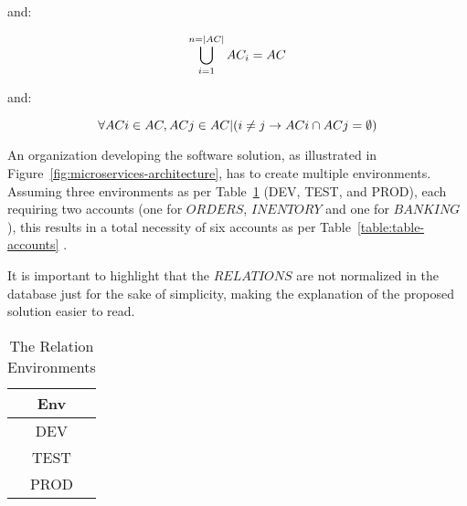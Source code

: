 and:

\begin{equation*}
    \begin{centering}
        \bigcup_{i=1}^{n = |AC|} AC_i = AC 
    \end{centering}
\end{equation*}

and:

\begin{equation*}
    \begin{centering}
        \forall ACi \in AC, ACj \in AC | (i \neq j \rightarrow ACi \cap ACj = \emptyset)
    \end{centering}
\end{equation*}

\vspace{15pt}

An organization developing the software solution, as illustrated in Figure~\ref{fig:microservices-architecture}, has to create multiple environments. 
Assuming three environments as per Table~\ref{table:table-environments} (DEV, TEST, and PROD), each requiring two accounts (one for $ORDERS$, $INENTORY$ and one for $BANKING$), this results in a total necessity of six accounts as per Table~\ref{table:table-accounts} .

\begin{boxF}
    It is important to highlight that the $RELATIONS$ are not normalized in the database just for the sake of simplicity, making the explanation of the proposed solution easier to read.
\end{boxF}

\begin{table}[h]
    \caption{The Relation Environments}
    \label{table:table-environments}
    \begin{center}
    \begin{tabular}{|c|}
    \hline
    Env\\
    \hline
    DEV \\
    \hline
    TEST \\
    \hline
    PROD \\
    \hline
    \end{tabular}
    \end{center}
\end{table}

